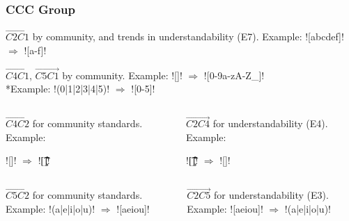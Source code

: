 

\begin{frame}[fragile]
\frametitle{CCC Group}

\begin{block}{$\overrightarrow{C2 C1}$ by community, and trends in understandability (E7).}
Example: \cverb![abcdef]! $\Rightarrow$ \cverb![a-f]!
\end{block}

\begin{block}{$\overrightarrow{C4 C1}$, $\overrightarrow{C5 C1}$ by community.}
Example: \cverb![\w]! $\Rightarrow$ \cverb![0-9a-zA-Z_]!
\\*Example: \cverb!(0|1|2|3|4|5)! $\Rightarrow$ \cverb![0-5]!
\end{block}

\begin{columns}
\begin{block}{$\overrightarrow{C4 C2}$ for community standards.}
Example: \begin{footnotesize}\cverb![\s]! $\Rightarrow$ \cverb![\t\n\r\c\v ]!\end{footnotesize}
\end{block}
\begin{block}{$\overrightarrow{C2 C4}$ for understandability (E4).}
Example: \begin{footnotesize}\cverb![\t\n\r\c\v ]! $\Rightarrow$ \cverb![\s]!\end{footnotesize}
\end{block}
\end{columns}

\begin{columns}
\begin{block}{$\overrightarrow{C5 C2}$ for community standards.}
Example: \cverb!(a|e|i|o|u)! $\Rightarrow$ \cverb![aeiou]!
\end{block}
\begin{block}{$\overrightarrow{C2 C5}$ for understandability (E3).}
Example: \cverb![aeiou]! $\Rightarrow$ \cverb!(a|e|i|o|u)!
\end{block}
\end{columns}

\end{frame}


